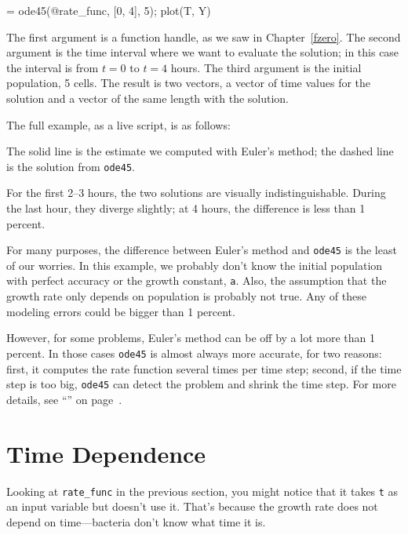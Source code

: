 \begin{code}
[T, Y] = ode45(@rate_func, [0, 4], 5);
plot(T, Y)
\end{code}

The first argument is a function handle, as we saw in Chapter~\ref{fzero}.  The second argument is the time interval where we want to evaluate the solution; in this case the interval is from $t=0$ to $t=4$ hours.  The third argument is the initial population, 5 cells.  The result is two vectors, a vector of time values for the solution and a vector of the same length with the solution.


The full example, as a live script, is as follows:


The solid line is the estimate we computed with Euler's method; the dashed line is the solution from \lstinline{ode45}.

For the first 2--3 hours, the two solutions are visually indistinguishable.  During the last hour, they diverge slightly; at 4 hours, the difference is less than 1 percent.

For many purposes, the difference between Euler's method and \lstinline{ode45} is the least of our worries.  In this example, we probably don't know the initial population with perfect accuracy or the growth constant, \lstinline{a}.  Also, the assumption that the growth rate only depends on population is probably not true.  Any of these modeling errors could be bigger than 1 percent.

However, for some problems, Euler's method can be off by a lot more than 1 percent.
In those cases \lstinline{ode45} is almost always more accurate, for two reasons: first, it computes the rate function several times per time step; second, if the time step is too big, \lstinline{ode45} can detect the problem and shrink the time step.  For more details, see ``'' on page~\pageref{s:howode45}.


\section{Time Dependence}

Looking at \lstinline{rate_func} in the previous section, you might notice that it takes \lstinline{t} as an input variable but doesn't use it.  That's because the growth rate does not depend on time---bacteria don't know what time it is.

